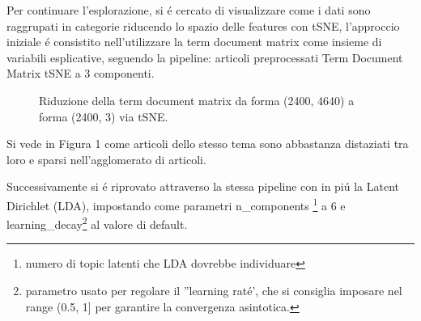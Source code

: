 \documentclass[runningheads]{llncs}
\begin{document}
Per continuare l'esplorazione, si \'e cercato di visualizzare come i dati sono raggrupati in categorie riducendo lo spazio delle features con tSNE, l'approccio iniziale \'e consistito nell'utilizzare la term document matrix
come insieme di variabili esplicative, seguendo la pipeline: articoli preprocessati \textpipe Term Document Matrix \textpipe tSNE a 3 componenti.

\begin{figure}%
    \centering
    \qquad
    \caption{Riduzione della term document matrix da forma (2400, 4640) a forma (2400, 3) via tSNE. }%
    \label{fig:tsne1}%
\end{figure}

Si vede in Figura 1 come articoli dello stesso tema sono abbastanza distaziati tra loro e sparsi nell'agglomerato di
articoli.\par

\qquad
\qquad




Successivamente si \'e riprovato attraverso la stessa pipeline con in pi\'u la Latent Dirichlet (LDA), impostando come parametri n\_components \footnote{numero di topic latenti che LDA dovrebbe individuare} a 6 e learning\_decay\footnote{parametro usato per regolare il ''learning rat\'e', che si consiglia imposare nel range (0.5, 1] per garantire la convergenza asintotica.} al valore di default.



\end{document}
